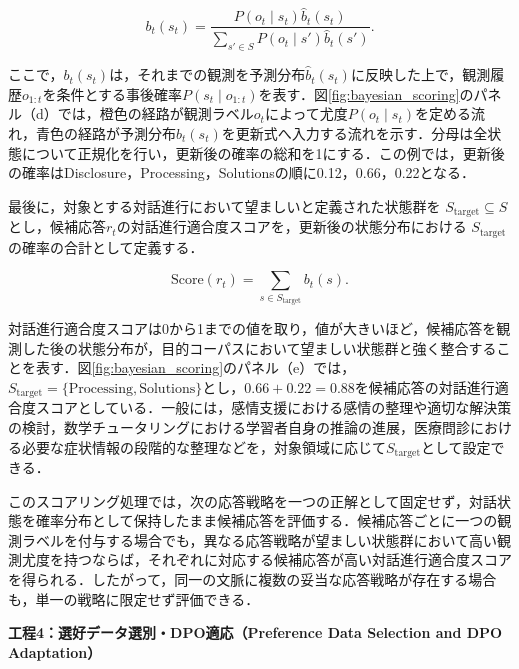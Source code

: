 \documentclass[manuscript,review,anonymous]{acmart}
\begin{document}
\begin{equation}
  b_t(s_t)
  =
  \frac{
    P(o_t\mid s_t)\hat{b}_t(s_t)
  }{
    \displaystyle
    \sum_{s'\in S}
    P(o_t\mid s')\hat{b}_t(s')
  }.
  \label{eq:update}
\end{equation}

ここで，$b_t(s_t)$は，それまでの観測を予測分布$\hat{b}_t(s_t)$に反映した上で，観測履歴$o_{1:t}$を条件とする事後確率$P(s_t\mid o_{1:t})$を表す．図\ref{fig:bayesian_scoring}のパネル（d）では，橙色の経路が観測ラベル$o_t$によって尤度$P(o_t\mid s_t)$を定める流れ，青色の経路が予測分布$\hat{b}_t(s_t)$を更新式へ入力する流れを示す．分母は全状態について正規化を行い，更新後の確率の総和を1にする．この例では，更新後の確率はDisclosure，Processing，Solutionsの順に0.12，0.66，0.22となる．

最後に，対象とする対話進行において望ましいと定義された状態群を
$S_{\mathrm{target}}\subseteq S$とし，候補応答$r_t$の対話進行適合度スコアを，更新後の状態分布における
$S_{\mathrm{target}}$の確率の合計として定義する．

\begin{equation}
  \mathrm{Score}(r_t)
  =
  \sum_{s\in S_{\mathrm{target}}}
  b_t(s).
  \label{eq:score}
\end{equation}

対話進行適合度スコアは0から1までの値を取り，値が大きいほど，候補応答を観測した後の状態分布が，目的コーパスにおいて望ましい状態群と強く整合することを表す．図\ref{fig:bayesian_scoring}のパネル（e）では，$S_{\mathrm{target}}=\{\mathrm{Processing},\allowbreak\mathrm{Solutions}\}$とし，$0.66+0.22=0.88$を候補応答の対話進行適合度スコアとしている．一般には，感情支援における感情の整理や適切な解決策の検討，数学チュータリングにおける学習者自身の推論の進展，医療問診における必要な症状情報の段階的な整理などを，対象領域に応じて$S_{\mathrm{target}}$として設定できる．

このスコアリング処理では，次の応答戦略を一つの正解として固定せず，対話状態を確率分布として保持したまま候補応答を評価する．候補応答ごとに一つの観測ラベルを付与する場合でも，異なる応答戦略が望ましい状態群において高い観測尤度を持つならば，それぞれに対応する候補応答が高い対話進行適合度スコアを得られる．したがって，同一の文脈に複数の妥当な応答戦略が存在する場合も，単一の戦略に限定せず評価できる．



\label{mod:preference_adaptation}
\noindent\textbf{工程4：選好データ選別・DPO適応（Preference Data Selection and DPO Adaptation）}\par
\end{document}
